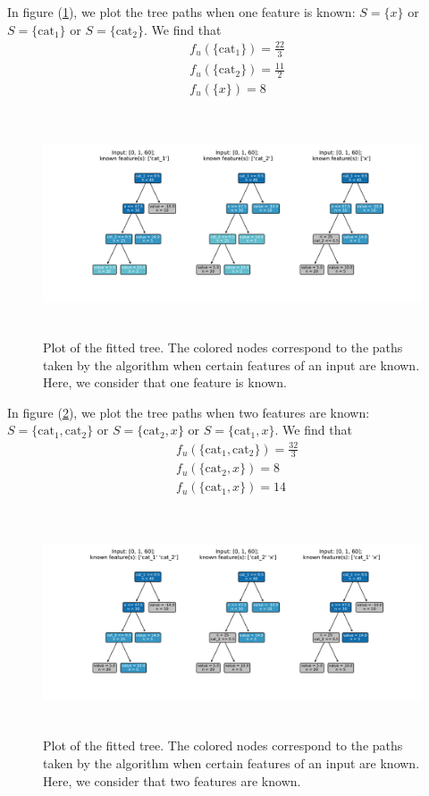 \documentclass[11pt]{article}
\begin{document}
In figure (\ref{fig:tree1}), we plot the tree paths when one feature is known: $S = \{x\}$ or $S = \{\text{cat}_1 \}$ or $S = \{\text{cat}_2 \}$.
We find that 
\begin{align*}
    & f_u(\{\text{cat}_1 \}) = \frac{22}{3}\\
    & f_u(\{\text{cat}_2 \}) = \frac{11}{2}\\
    & f_u(\{ x \}) = 8
\end{align*}

\begin{figure}[H]
    \centering
    \includegraphics[height=6.6cm]{"../outputs/plot_tree/figures/path_1_known.pdf"}
    \caption{Plot of the fitted tree. The colored nodes correspond to the paths taken 
    by the algorithm when certain features of an input are known. Here, we consider that 
    one feature is known.}
    \label{fig:tree1}
\end{figure}

In figure (\ref{fig:tree2}), we plot the tree paths when two features are known: $S = \{\text{cat}_1, \text{cat}_2\}$ or $S = \{\text{cat}_2, x \}$ or $S = \{\text{cat}_1, x \}$.
We find that 
\begin{align*}
    & f_u(\{\text{cat}_1, \text{cat}_2\}) = \frac{32}{3}\\
    & f_u(\{\text{cat}_2, x \}) = 8\\
    & f_u(\{\text{cat}_1, x\}) = 14
\end{align*}

\begin{figure}[H]
    \centering
    \includegraphics[height=6.6cm]{"../outputs/plot_tree/figures/path_2_known.pdf"}
    \caption{Plot of the fitted tree. The colored nodes correspond to the paths taken 
    by the algorithm when certain features of an input are known. Here, we consider that 
    two features are known.}
    \label{fig:tree2}
\end{figure}
\end{document}
